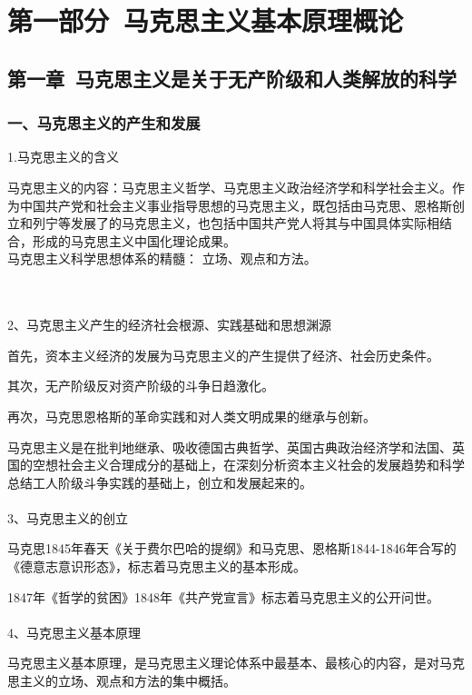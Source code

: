 \documentclass{ctexart}
\begin{document}
\tableofcontents


\section{第一部分\ 马克思主义基本原理概论}

\subsection{第一章\ 马克思主义是关于无产阶级和人类解放的科学}
\subsubsection{一、马克思主义的产生和发展}

1.马克思主义的含义

马克思主义的内容：马克思主义哲学、马克思主义政治经济学和科学社会主义。作为中国共产党和社会主义事业指导思想的马克思主义，既包括由马克思、恩格斯创立和列宁等发展了的马克思主义，也包括中国共产党人将其与中国具体实际相结合，形成的马克思主义中国化理论成果。
\\

马克思主义科学思想体系的精髓： 立场、观点和方法。


\\\\

2、马克思主义产生的经济社会根源、实践基础和思想渊源

首先，资本主义经济的发展为马克思主义的产生提供了经济、社会历史条件。

其次，无产阶级反对资产阶级的斗争日趋激化。

再次，马克思恩格斯的革命实践和对人类文明成果的继承与创新。

马克思主义是在批判地继承、吸收德国古典哲学、英国古典政治经济学和法国、英国的空想社会主义合理成分的基础上，在深刻分析资本主义社会的发展趋势和科学总结工人阶级斗争实践的基础上，创立和发展起来的。
\\\\

3、马克思主义的创立

马克思1845年春天《关于费尔巴哈的提纲》和马克思、恩格斯1844-1846年合写的《德意志意识形态》，标志着马克思主义的基本形成。

1847年《哲学的贫困》1848年《共产党宣言》标志着马克思主义的公开问世。
\\\\

4、马克思主义基本原理

马克思主义基本原理，是马克思主义理论体系中最基本、最核心的内容，是对马克思主义的立场、观点和方法的集中概括。
\end{document}
